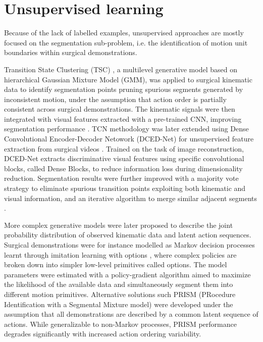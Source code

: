 \documentclass[journal]{IEEEtran}
\begin{document}
\section{Unsupervised learning} \label{Unsupervised learning}

Because of the lack of labelled examples, unsupervised approaches are mostly focused on the segmentation sub-problem, i.e. the identification of motion unit boundaries within surgical demonstrations.

Transition State Clustering (TSC) \cite{Krishnan2015}, a multilevel generative model based on hierarchical Gaussian Mixture Model (GMM), was applied to surgical kinematic data to identify segmentation points pruning spurious segments generated by inconsistent motion, 
under the assumption that action order is partially consistent across surgical demonstrations.
The kinematic signals were then integrated with visual features extracted with a pre-trained CNN, improving segmentation performance \cite{Murali2016}. 
TCN methodology was later extended using Dense Convolutional Encoder-Decoder Netowork (DCED-Net) for unsupervised feature extraction from surgical videos \cite{Zhao2018}. Trained on the task of image reconstruction, DCED-Net extracts discriminative visual features using specific convolutional blocks, called Dense Blocks, to reduce information loss during dimensionality reduction.
Segmentation results were further improved with a majority vote strategy to eliminate spurious transition points exploiting both kinematic and visual information, and an iterative algorithm to merge similar adjacent segments \cite{Zhao2018}.

More complex generative models were later proposed to describe the joint probability distribution of observed kinematic data and latent action sequences.  
Surgical demonstrations were for instance modelled as Markov decision processes learnt through imitation learning with options \cite{Fox2017}, where complex policies are broken down into simpler low-level primitives called options. 
The model parameters were estimated with a policy-gradient algorithm aimed to maximize the likelihood of the available data and simultaneously segment them into different motion primitives.
Alternative solutions such PRISM (PRocedure Identification with a Segmental Mixture model) \cite{Goel2019} were developed under the assumption that all demonstrations are described by a common latent sequence of actions. While generalizable to non-Markov processes, PRISM performance degrades significantly with increased action ordering variability.
\end{document}
